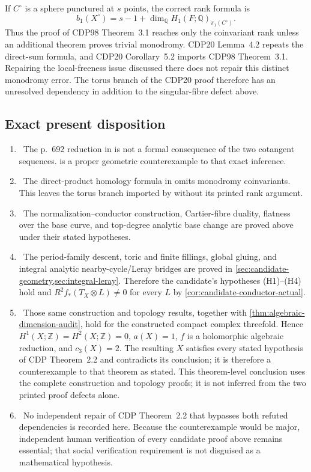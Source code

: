 If $C^\circ$ is a sphere punctured at $s$ points, the correct rank formula is
\[
b_1(X^\circ)=s-1+
\dim_{\mathbb Q}H_1(F;\mathbb Q)_{\pi_1(C^\circ)}.
\tag{5.22}
\]
Thus the proof of CDP98 Theorem~3.1 reaches only the coinvariant rank unless
an additional theorem proves trivial monodromy.  CDP20 Lemma~4.2 repeats the
direct-sum formula, and CDP20 Corollary~5.2 imports CDP98 Theorem~3.1.
Repairing the local-freeness issue discussed there does not repair this
distinct monodromy error.  The torus branch of the CDP20 proof therefore has
an unresolved dependency in addition to the singular-fibre defect above.

\subsection{Exact present disposition}

\begin{enumerate}[label=\arabic*.]
\item \Refuted\ The p.~692 reduction in \cite{CDP2020} is not a formal
consequence of the two cotangent sequences.
 is a proper geometric counterexample to
that exact inference.
\item \Refuted\ The direct-product homology formula in
\cite[Lemma~3.2]{CDP1998} omits monodromy coinvariants.  This leaves the
torus branch imported by \cite{CDP2020} without its printed rank argument.
\item \Verified\ The normalization--conductor construction,
Cartier-fibre duality, flatness over the base curve, and top-degree analytic
base change are proved above under their stated hypotheses.
\item \Verified\ The period-family descent, toric and finite fillings,
global gluing, and integral analytic nearby-cycle/Leray bridges are proved in
\cref{sec:candidate-geometry,sec:integral-leray}.  Therefore the candidate's
hypotheses (H1)--(H4) hold and
$R^2f_*(T_X\otimes L)\ne0$ for every $L$ by
\cref{cor:candidate-conductor-actual}.
\item \Verified\ Those same construction and topology results, together
with \cref{thm:algebraic-dimension-audit}, hold for the constructed compact
complex threefold.  Hence
$H^1(X;\mathbb Z)=H^2(X;\mathbb Z)=0$, $a(X)=1$, $f$ is a holomorphic
algebraic reduction, and $c_3(X)=2$.  The resulting $X$ satisfies every
stated hypothesis of CDP Theorem~2.2 and contradicts its conclusion; it is
therefore a counterexample to that theorem as stated.  This theorem-level
conclusion uses the complete construction and topology proofs; it is not
inferred from the two printed proof defects alone.
\item \Open\ No independent repair of CDP Theorem~2.2 that bypasses both
refuted dependencies is recorded here.  Because the counterexample would be
major, independent human verification of every candidate proof above remains
essential; that social verification requirement is not disguised as a
mathematical hypothesis.
\end{enumerate}


